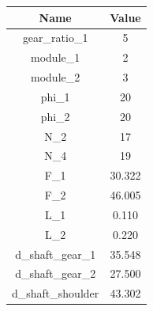 \begin{tabular}{|c|c|}
\hline
Name & Value \\ \hline

gear_ratio_1 & 5 \\ \hline
module_1 & 2 \\ \hline
module_2 & 3 \\ \hline
phi_1 & 20 \\ \hline
phi_2 & 20 \\ \hline
N_2 & 17 \\ \hline
N_4 & 19 \\ \hline
F_1 & 30.322 \\ \hline
F_2 & 46.005 \\ \hline
L_1 & 0.110 \\ \hline
L_2 & 0.220 \\ \hline
d_shaft_gear_1 & 35.548 \\ \hline
d_shaft_gear_2 & 27.500 \\ \hline
d_shaft_shoulder & 43.302 \\ \hline

\end{tabular}
